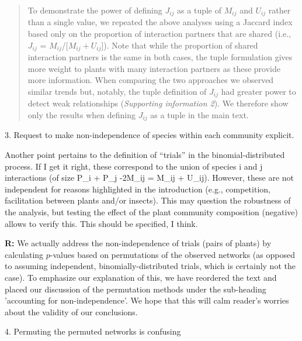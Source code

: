 \documentclass[12pt]{letter}
\newenvironment{refquote}{\bigskip \begin{it}}{\end{it}\smallskip}
\begin{document}
			\begin{quotation}

				To demonstrate the power of defining $J_{ij}$ as a tuple of $M_{ij}$ and $U_{ij}$ rather than a single value, we repeated the above analyses using a Jaccard index based only on the proportion of interaction partners that are shared (i.e., $J_{ij}$ = $M_{ij}$/[$M_{ij}+U_{ij}$]). Note that while the proportion of shared interaction partners is the same in both cases, the tuple formulation gives more weight to plants with many interaction partners as these provide more information. When comparing the two approaches 
				we observed similar trends but, notably, the tuple definition of $J_{ij}$ had greater power to detect weak relationships (\emph{Supporting information 2}). We therefore show only the results when defining $J_{ij}$ as a tuple in the main text.

			\end{quotation}


	3. Request to make non-independence of species within each community explicit. 

		\begin{refquote}
			Another point pertains to the definition of “trials” in the binomial-distributed process. If I get it right, these correspond to the union of species i and j interactions (of size P\_i + P\_j -2M\_ij = M\_ij + U\_ij). However, these are not independent for reasons highlighted in the introduction (e.g., competition, facilitation between plants and/or insects). This may question the robustness of the analysis, but testing the effect of the plant community composition (negative) allows to verify this. This should be specified, I think.
		\end{refquote}


		\textbf{R:} We actually address the non-independence of trials (pairs of plants) by calculating $p$-values based on permutations of the observed networks (as opposed to assuming independent, binomially-distributed trials, which is certainly not the case). To emphasize our explanation of this, we have reordered the text and placed our discussion of the permutation methods under the sub-heading 'accounting for non-independence'. We hope that this will calm reader's worries about the validity of our conclusions.


	4. Permuting the permuted networks is confusing
\end{document}
